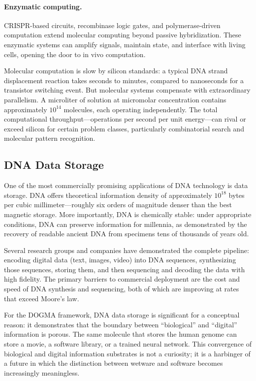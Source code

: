 \paragraph{Enzymatic computing.} CRISPR-based circuits, recombinase logic gates, and polymerase-driven computation extend molecular computing beyond passive hybridization. These enzymatic systems can amplify signals, maintain state, and interface with living cells, opening the door to in vivo computation.

\begin{implnote}
Molecular computation is slow by silicon standards: a typical DNA strand displacement reaction takes seconds to minutes, compared to nanoseconds for a transistor switching event. But molecular systems compensate with extraordinary parallelism. A microliter of solution at micromolar concentration contains approximately $10^{14}$ molecules, each operating independently. The total computational throughput---operations per second per unit energy---can rival or exceed silicon for certain problem classes, particularly combinatorial search and molecular pattern recognition.
\end{implnote}

\subsection{DNA Data Storage}

One of the most commercially promising applications of DNA technology is data storage. DNA offers theoretical information density of approximately $10^{18}$ bytes per cubic millimeter---roughly six orders of magnitude denser than the best magnetic storage. More importantly, DNA is chemically stable: under appropriate conditions, DNA can preserve information for millennia, as demonstrated by the recovery of readable ancient DNA from specimens tens of thousands of years old.

Several research groups and companies have demonstrated the complete pipeline: encoding digital data (text, images, video) into DNA sequences, synthesizing those sequences, storing them, and then sequencing and decoding the data with high fidelity. The primary barriers to commercial deployment are the cost and speed of DNA synthesis and sequencing, both of which are improving at rates that exceed Moore's law.

For the DOGMA framework, DNA data storage is significant for a conceptual reason: it demonstrates that the boundary between ``biological'' and ``digital'' information is porous. The same molecule that stores the human genome can store a movie, a software library, or a trained neural network. This convergence of biological and digital information substrates is not a curiosity; it is a harbinger of a future in which the distinction between wetware and software becomes increasingly meaningless.


